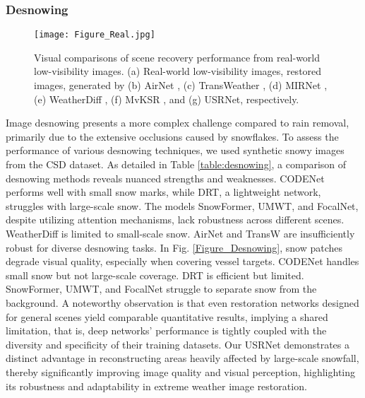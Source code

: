 \documentclass[final,12pt]{elsarticle}
\begin{document}
\subsubsection{Desnowing}
%
    \begin{figure*}[t]
        \centering
        \texttt{[image: Figure\_Real.jpg]}
        \caption{Visual comparisons of scene recovery performance from real-world low-visibility images. (a) Real-world low-visibility images, restored images, generated by (b) AirNet \citep{li2022all}, (c) TransWeather \citep{valanarasu2022transweather}, (d) MIRNet \citep{zamir2020learning}, (e) WeatherDiff \citep{ozdenizci2023restoring}, (f) MvKSR \citep{xu2024mvksr}, and (g) USRNet, respectively.}
        \label{Fig_real}
    \end{figure*}
    Image desnowing presents a more complex challenge compared to rain removal, primarily due to the extensive occlusions caused by snowflakes. To assess the performance of various desnowing techniques, we used synthetic snowy images from the CSD dataset. As detailed in Table \ref{table:desnowing}, a comparison of desnowing methods reveals nuanced strengths and weaknesses. CODENet performs well with small snow marks, while DRT, a lightweight network, struggles with large-scale snow. The models SnowFormer, UMWT, and FocalNet, despite utilizing attention mechanisms, lack robustness across different scenes. WeatherDiff is limited to small-scale snow. AirNet and TransW are insufficiently robust for diverse desnowing tasks. In Fig. \ref{Figure_Desnowing}, snow patches degrade visual quality, especially when covering vessel targets. CODENet handles small snow but not large-scale coverage. DRT is efficient but limited. SnowFormer, UMWT, and FocalNet struggle to separate snow from the background. A noteworthy observation is that even restoration networks designed for general scenes yield comparable quantitative results, implying a shared limitation, that is, deep networks' performance is tightly coupled with the diversity and specificity of their training datasets. Our USRNet demonstrates a distinct advantage in reconstructing areas heavily affected by large-scale snowfall, thereby significantly improving image quality and visual perception, highlighting its robustness and adaptability in extreme weather image restoration.
\end{document}
